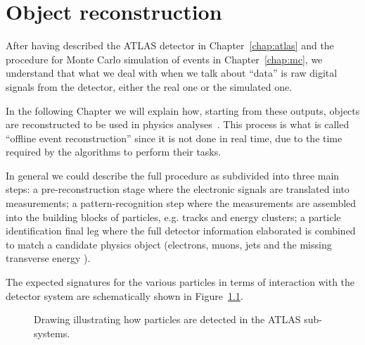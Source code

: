 \clearpage{\pagestyle{empty}\cleardoublepage}

\chapter{Object reconstruction}\label{chap:objects}

After having described the ATLAS detector in Chapter~\ref{chap:atlas} 
and the procedure for Monte Carlo simulation of events in Chapter~\ref{chap:mc},
we understand that what we deal with when we talk about ``data'' 
is raw digital signals from the detector,
either the real one or the simulated one.

In the following Chapter we will explain how, starting from these outputs,
objects are reconstructed to be used in physics analyses~\cite{Aad:2009wy}. 
This process is what is called ``offline event reconstruction'' since
it is not done in real time, due to the time required by the algorithms
to perform their tasks.

In general we could describe the full procedure as subdivided into
three main steps: a pre-reconstruction stage where the electronic signals are
translated into measurements; a pattern-recognition step where the measurements
are assembled into the building blocks of particles, e.g. tracks and energy clusters;
a particle identification final leg where the full detector information elaborated 
is combined to match a candidate physics object 
(electrons, muons, jets and the missing transverse energy \met).

The expected signatures for the various particles in terms of interaction
with the detector system are schematically shown in Figure~\ref{fig:decaychart}.

\begin{figure}[tb]\begin{center}
	\caption{Drawing illustrating how particles are detected in the ATLAS sub-systems.
	\label{fig:decaychart}}
\end{center}\end{figure}

